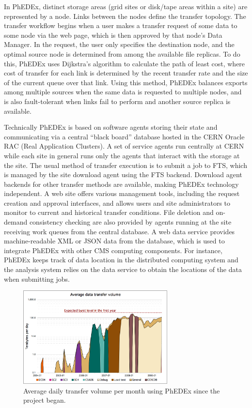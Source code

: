 In PhEDEx, distinct storage areas (grid sites or disk/tape areas
within a site) are represented by a node.  Links between the nodes
define the transfer topology.  The transfer workflow begins when a
user makes a transfer request of some data to some node via the web
page, which is then approved by that node's Data Manager.  In the
request, the user only specifies the destination node, and the optimal
source node is determined from among the available file replicas.  To
do this, PhEDEx uses Dijkstra's algorithm to calculate the path of
least cost, where cost of transfer for each link is determined by the
recent transfer rate and the size of the current queue over that link.
Using this method, PhEDEx balances exports among multiple sources when
the same data is requested to multiple nodes, and is also
fault-tolerant when links fail to perform and another source replica
is available.

Technically PhEDEx is based on software agents storing their state and
communicating via a central ``black board'' database hosted in the
CERN Oracle RAC (Real Application Clusters). A set of service agents
run centrally at CERN while each site in general runs
only the agents that interact with the storage at the site. The usual
method of transfer execution is to submit a job to FTS, which is
managed by the site download agent using the FTS backend.  Download
agent backends for other transfer methods are available, making PhEDEx
technology independent. A web site offers various management tools,
including the request creation and approval interfaces, and allows
users and site administrators to monitor to current and historical
transfer conditions.  File deletion and on-demand consistency checking
are also provided by agents running at the site receiving work queues
from the central database.  A web data service provides
machine-readable XML or JSON data from the database, which is used to
integrate PhEDEx with other CMS computing components.  For instance,
PhEDEx keeps track of data location in the distributed computing
system and the analysis system relies on the data service to obtain
the locations of the data when submitting jobs.

\begin{figure}
 \includegraphics[width=0.70\textwidth]{figures/phedex-avg-monthly-volume.png}
\caption{Average daily transfer volume per month using PhEDEx since the project began.}
\label{fig:phedex-transfers}
\end{figure}

